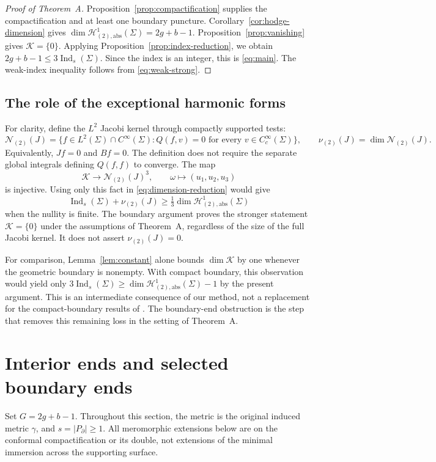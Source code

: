 \documentclass[11pt]{amsart}
\numberwithin{equation}{section}
\theoremstyle{definition}
\theoremstyle{remark}
\newcommand{\HH}{\mathcal H}
\newcommand{\KK}{\mathcal K}
\newcommand{\NN}{\mathcal N}
\DeclareMathOperator{\Ind}{Ind}
\begin{document}
\begin{proof}[Proof of Theorem~A]
Proposition~\ref{prop:compactification} supplies the compactification and at least one boundary puncture. Corollary~\ref{cor:hodge-dimension} gives
$\dim\HH^1_{(2),\mathrm{abs}}(\Sigma)=2g+b-1$.
Proposition~\ref{prop:vanishing} gives $\KK=\{0\}$. Applying Proposition~\ref{prop:index-reduction}, we obtain $2g+b-1\le3\Ind_s(\Sigma)$. Since the index is an integer, this is \eqref{eq:main}. The weak-index inequality follows from \eqref{eq:weak-strong}.
\end{proof}

\subsection*{The role of the exceptional harmonic forms}
For clarity, define the $L^2$ Jacobi kernel through compactly supported tests:
\[
\NN_{(2)}(J)=\{f\in L^2(\Sigma)\cap C^\infty(\Sigma):
Q(f,v)=0\text{ for every }v\in C_c^\infty(\Sigma)\},
\qquad \nu_{(2)}(J)=\dim\NN_{(2)}(J).
\]
Equivalently, $Jf=0$ and $Bf=0$. The definition does not require the separate global integrals defining $Q(f,f)$ to converge. The map
\[
\KK\longrightarrow\NN_{(2)}(J)^3,\qquad
\omega\longmapsto(u_1,u_2,u_3)
\]
is injective. Using only this fact in \eqref{eq:dimension-reduction} would give
\[
\Ind_s(\Sigma)+\nu_{(2)}(J)
\ge\tfrac13\dim\HH^1_{(2),\mathrm{abs}}(\Sigma)
\]
when the nullity is finite. The boundary argument proves the stronger statement $\KK=\{0\}$ under the assumptions of Theorem~A, regardless of the size of the full Jacobi kernel. It does not assert $\nu_{(2)}(J)=0$.

For comparison, Lemma~\ref{lem:constant} alone bounds $\dim\KK$ by one whenever the geometric boundary is nonempty. With compact boundary, this observation would yield only
$3\Ind_s(\Sigma)\ge\dim\HH^1_{(2),\mathrm{abs}}(\Sigma)-1$
by the present argument. This is an intermediate consequence of our method, not a replacement for the compact-boundary results of \cite{CMS26}. The boundary-end obstruction is the step that removes this remaining loss in the setting of Theorem~A.

\section{Interior ends and selected boundary ends}\label{sec:ends}
Set $G=2g+b-1$. Throughout this section, the metric is the original induced metric $\gamma$, and $s=|P_{\partial}|\ge1$. All meromorphic extensions below are on the conformal compactification or its double, not extensions of the minimal immersion across the supporting surface.
\end{document}
